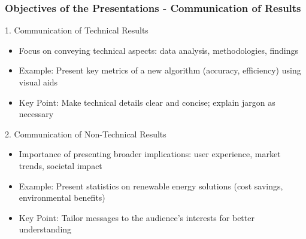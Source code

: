 \documentclass{beamer}
\begin{document}
\begin{frame}[fragile]
    \frametitle{Objectives of the Presentations - Communication of Results}
    \begin{block}{1. Communication of Technical Results}
        \begin{itemize}
            \item Focus on conveying technical aspects: data analysis, methodologies, findings
            \item Example: Present key metrics of a new algorithm (accuracy, efficiency) using visual aids
            \item Key Point: Make technical details clear and concise; explain jargon as necessary
        \end{itemize}
    \end{block}

    \begin{block}{2. Communication of Non-Technical Results}
        \begin{itemize}
            \item Importance of presenting broader implications: user experience, market trends, societal impact
            \item Example: Present statistics on renewable energy solutions (cost savings, environmental benefits)
            \item Key Point: Tailor messages to the audience's interests for better understanding
        \end{itemize}
    \end{block}
\end{frame}
\end{document}
